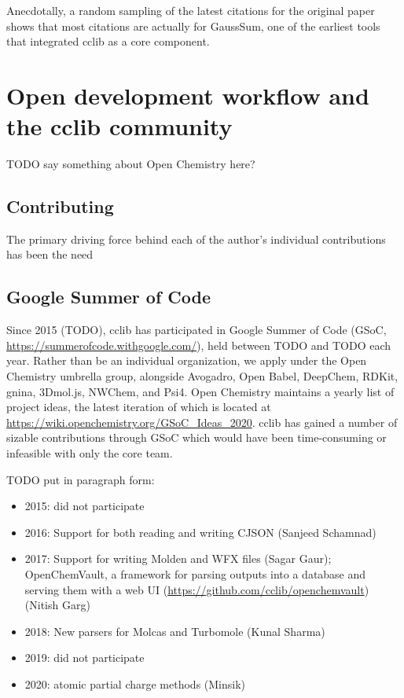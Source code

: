 \documentclass[num-refs]{wiley-article}
\begin{document}
Anecdotally, a random sampling of the latest citations for the original paper shows that most citations are actually for GaussSum, one of the earliest tools that integrated cclib as a core component.

\section{Open development workflow and the cclib community}

TODO say something about Open Chemistry here?

\subsection{Contributing}

The primary driving force behind each of the author's individual contributions has been the need

\cite{Berquist2017,Upadhyay2020}

\subsection{Google Summer of Code}

Since 2015 (TODO), cclib has participated in Google Summer of Code (GSoC, \url{https://summerofcode.withgoogle.com/}), held between TODO and TODO each year.  Rather than be an individual organization, we apply under the Open Chemistry umbrella group, alongside Avogadro, Open Babel, DeepChem, RDKit, gnina, 3Dmol.js, NWChem, and Psi4.  Open Chemistry maintains a yearly list of project ideas, the latest iteration of which is located at \url{https://wiki.openchemistry.org/GSoC_Ideas_2020}.  cclib has gained a number of sizable contributions through GSoC which would have been time-consuming or infeasible with only the core team.

TODO put in paragraph form:
\begin{itemize}
\item 2015: did not participate
\item 2016: Support for both reading and writing CJSON (Sanjeed Schamnad)
\item 2017: Support for writing Molden and WFX files (Sagar Gaur); OpenChemVault, a framework for parsing outputs into a database and serving them with a web UI (\url{https://github.com/cclib/openchemvault}) (Nitish Garg)
\item 2018: New parsers for Molcas and Turbomole (Kunal Sharma)
\item 2019: did not participate
\item 2020: atomic partial charge methods (Minsik)
\end{itemize}
\end{document}
